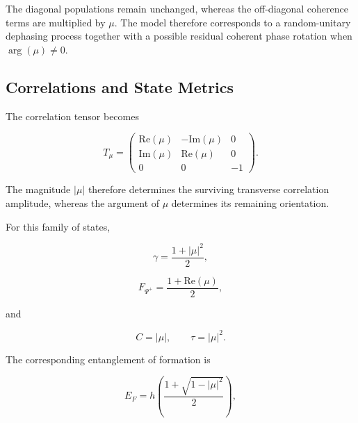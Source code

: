 The diagonal populations remain unchanged, whereas the off-diagonal coherence
terms are multiplied by \( \mu \). The model therefore corresponds to a
random-unitary dephasing process together with a possible residual coherent phase
rotation when \( \arg(\mu)\neq0 \).


\subsection{Correlations and State Metrics}
\label{subsec:statistical_phase_metrics}

The correlation tensor becomes

\begin{equation}
T_\mu
=
\begin{pmatrix}
\mathrm{Re}(\mu) & -\mathrm{Im}(\mu) & 0\\
\mathrm{Im}(\mu) & \mathrm{Re}(\mu) & 0\\
0 & 0 & -1
\end{pmatrix}.
\label{eq:random_phase_correlation_tensor}
\end{equation}

The magnitude \( |\mu| \) therefore determines the surviving transverse
correlation amplitude, whereas the argument of \( \mu \) determines its remaining
orientation.

For this family of states,

\begin{equation}
\gamma
=
\frac{1+|\mu|^2}{2},
\label{eq:random_phase_purity}
\end{equation}

\begin{equation}
F_{\Psi^+}
=
\frac{1+\mathrm{Re}(\mu)}{2},
\label{eq:random_phase_fidelity}
\end{equation}

and

\begin{equation}
C
=
|\mu|,
\qquad
\tau
=
|\mu|^2.
\label{eq:random_phase_concurrence_tangle}
\end{equation}

The corresponding entanglement of formation is

\begin{equation}
E_F
=
h
\left(
\frac{
1+\sqrt{1-|\mu|^2}
}{2}
\right),
\label{eq:random_phase_eof}
\end{equation}

